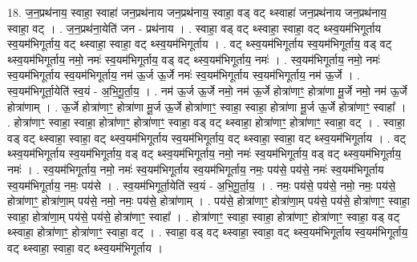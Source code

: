 \documentclass[17pt]{extarticle}
\begin{document}
18. ज॒न॒प्रथ॑नाय॒ स्वाहा॒ स्वाहा॑ जन॒प्रथ॑नाय जन॒प्रथ॑नाय॒ स्वाहा॒ वड् वट् थ्स्वाहा॑ जन॒प्रथ॑नाय जन॒प्रथ॑नाय॒ स्वाहा॒ वट् । . ज॒न॒प्रथ॑ना॒येति॑ जन - प्रथ॑नाय । . स्वाहा॒ वड् वट् थ्स्वाहा॒ स्वाहा॒ वट् थ्स्व॒यम॑भिगूर्ताय स्व॒यम॑भिगूर्ताय॒ वट् थ्स्वाहा॒ स्वाहा॒ वट् थ्स्व॒यम॑भिगूर्ताय । . वट् थ्स्व॒यम॑भिगूर्ताय स्व॒यम॑भिगूर्ताय॒ वड् वट् थ्स्व॒यम॑भिगूर्ताय॒ नमो॒ नमः॑ स्व॒यम॑भिगूर्ताय॒ वड् वट् थ्स्व॒यम॑भिगूर्ताय॒ नमः॑ । . स्व॒यम॑भिगूर्ताय॒ नमो॒ नमः॑ स्व॒यम॑भिगूर्ताय स्व॒यम॑भिगूर्ताय॒ नम॑ ऊ॒र्ज ऊ॒र्जे नमः॑ स्व॒यम॑भिगूर्ताय स्व॒यम॑भिगूर्ताय॒ नम॑ ऊ॒र्जे । . स्व॒यम॑भिगूर्ता॒येति॑ स्व॒यं - अ॒भि॒गू॒र्ता॒य॒ । . नम॑ ऊ॒र्ज ऊ॒र्जे नमो॒ नम॑ ऊ॒र्जे होत्रा॑णाꣳ॒॒ होत्रा॑णा मू॒र्जे नमो॒ नम॑ ऊ॒र्जे होत्रा॑णाम् । . ऊ॒र्जे होत्रा॑णाꣳ॒॒ होत्रा॑णा मू॒र्ज ऊ॒र्जे होत्रा॑णाꣳ॒॒ स्वाहा॒ स्वाहा॒ होत्रा॑णा मू॒र्ज ऊ॒र्जे होत्रा॑णाꣳ॒॒ स्वाहा᳚ । . होत्रा॑णाꣳ॒॒ स्वाहा॒ स्वाहा॒ होत्रा॑णाꣳ॒॒ होत्रा॑णाꣳ॒॒ स्वाहा॒ वड् वट् थ्स्वाहा॒ होत्रा॑णाꣳ॒॒ होत्रा॑णाꣳ॒॒ स्वाहा॒ वट् । . स्वाहा॒ वड् वट् थ्स्वाहा॒ स्वाहा॒ वट् थ्स्व॒यम॑भिगूर्ताय स्व॒यम॑भिगूर्ताय॒ वट् थ्स्वाहा॒ स्वाहा॒ वट् थ्स्व॒यम॑भिगूर्ताय । . वट् थ्स्व॒यम॑भिगूर्ताय स्व॒यम॑भिगूर्ताय॒ वड् वट् थ्स्व॒यम॑भिगूर्ताय॒ नमो॒ नमः॑ स्व॒यम॑भिगूर्ताय॒ वड् वट् थ्स्व॒यम॑भिगूर्ताय॒ नमः॑ । . स्व॒यम॑भिगूर्ताय॒ नमो॒ नमः॑ स्व॒यम॑भिगूर्ताय स्व॒यम॑भिगूर्ताय॒ नमः॒ पय॑से॒ पय॑से॒ नमः॑ स्व॒यम॑भिगूर्ताय स्व॒यम॑भिगूर्ताय॒ नमः॒ पय॑से । . स्व॒यम॑भिगूर्ता॒येति॑ स्व॒यं - अ॒भि॒गू॒र्ता॒य॒ । . नमः॒ पय॑से॒ पय॑से॒ नमो॒ नमः॒ पय॑से॒ होत्रा॑णाꣳ॒॒ होत्रा॑णा॒म् पय॑से॒ नमो॒ नमः॒ पय॑से॒ होत्रा॑णाम् । . पय॑से॒ होत्रा॑णाꣳ॒॒ होत्रा॑णा॒म् पय॑से॒ पय॑से॒ होत्रा॑णाꣳ॒॒ स्वाहा॒ स्वाहा॒ होत्रा॑णा॒म् पय॑से॒ पय॑से॒ होत्रा॑णाꣳ॒॒ स्वाहा᳚ । . होत्रा॑णाꣳ॒॒ स्वाहा॒ स्वाहा॒ होत्रा॑णाꣳ॒॒ होत्रा॑णाꣳ॒॒ स्वाहा॒ वड् वट् थ्स्वाहा॒ होत्रा॑णाꣳ॒॒ होत्रा॑णाꣳ॒॒ स्वाहा॒ वट् । . स्वाहा॒ वड् वट् थ्स्वाहा॒ स्वाहा॒ वट् थ्स्व॒यम॑भिगूर्ताय स्व॒यम॑भिगूर्ताय॒ वट् थ्स्वाहा॒ स्वाहा॒ वट् थ्स्व॒यम॑भिगूर्ताय । \newline
\end{document}
